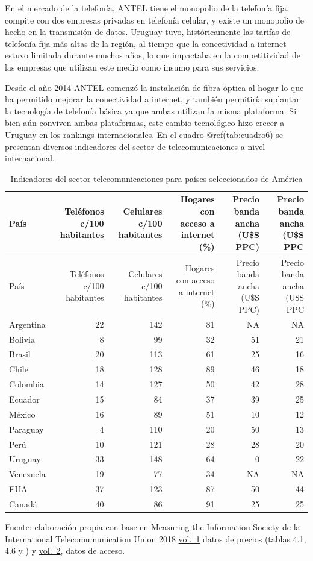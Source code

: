 \documentclass[
  12pt,
  spanish,
]{book}
\begin{document}
En el mercado de la telefonía, ANTEL tiene el monopolio de la telefonía
fija, compite con dos empresas privadas en telefonía celular, y existe
un monopolio de hecho en la transmisión de datos. Uruguay tuvo,
históricamente las tarifas de telefonía fija más altas de la región, al
tiempo que la conectividad a internet estuvo limitada durante muchos
años, lo que impactaba en la competitividad de las empresas que utilizan
este medio como insumo para sus servicios.

Desde el año 2014 ANTEL comenzó la instalación de fibra óptica al hogar
lo que ha permitido mejorar la conectividad a internet, y también
permitiría suplantar la tecnología de telefonía básica ya que ambas
utilizan la misma plataforma. Si bien aún conviven ambas plataformas,
este cambio tecnológico hizo crecer a Uruguay en los rankings
internacionales. En el cuadro @ref(tab:cuadro6) se presentan diversos
indicadores del sector de telecomunicaciones a nivel internacional.

\begin{longtable}[]{@{}lrrrrr@{}}
\caption{Indicadores del sector telecomunicaciones para países
seleccionados de América}\tabularnewline
\toprule
País & Teléfonos c/100 habitantes & Celulares c/100 habitantes & Hogares
con acceso a internet (\%) & Precio banda ancha (U\$S PPC) & Precio
banda ancha (U\$S PPC\tabularnewline
\midrule
\endfirsthead
\toprule
País & Teléfonos c/100 habitantes & Celulares c/100 habitantes & Hogares
con acceso a internet (\%) & Precio banda ancha (U\$S PPC) & Precio
banda ancha (U\$S PPC\tabularnewline
\midrule
\endhead
Argentina & 22 & 142 & 81 & NA & NA\tabularnewline
Bolivia & 8 & 99 & 32 & 51 & 21\tabularnewline
Brasil & 20 & 113 & 61 & 25 & 16\tabularnewline
Chile & 18 & 128 & 89 & 46 & 18\tabularnewline
Colombia & 14 & 127 & 50 & 42 & 28\tabularnewline
Ecuador & 15 & 84 & 37 & 39 & 25\tabularnewline
México & 16 & 89 & 51 & 10 & 12\tabularnewline
Paraguay & 4 & 110 & 20 & 50 & 13\tabularnewline
Perú & 10 & 121 & 28 & 28 & 20\tabularnewline
Uruguay & 33 & 148 & 64 & 0 & 22\tabularnewline
Venezuela & 19 & 77 & 34 & NA & NA\tabularnewline
EUA & 37 & 123 & 87 & 50 & 44\tabularnewline
Canadá & 40 & 86 & 91 & 25 & 25\tabularnewline
\bottomrule
\end{longtable}

Fuente: elaboración propia con base en Measuring the Information Society
de la International Telecomumunication Union 2018
\href{https://www.itu.int/en/ITU-D/Statistics/Documents/publications/misr2018/MISR-2018-Vol-1-E.pdf}{vol.~1}
datos de precios (tablas 4.1, 4.6 y ) y
\href{https://www.itu.int/en/ITU-D/Statistics/Documents/publications/misr2018/MISR-2018-Vol-2-E.pdf}{vol.~2},
datos de acceso.
\end{document}
